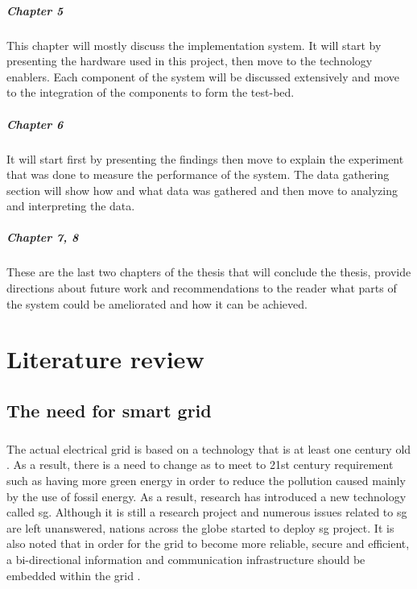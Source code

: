 \documentclass[oneside,12pt,a4paper,final]{book}
\begin{document}
\paragraph{Chapter 5}
This chapter will mostly discuss the implementation system. It will start by presenting the hardware used in this project, then move to the technology enablers. Each component of the system will be discussed extensively and move to the integration of the components to form the test-bed.
\paragraph{Chapter 6}
It will start first by presenting the findings then move to explain the experiment that was done to measure the performance of the system. The data gathering section will show how and what data was gathered and then move to analyzing and interpreting the data.
\paragraph{Chapter 7, 8}
These are the last two chapters of the thesis that will conclude the thesis, provide directions about future work and recommendations to the reader what parts of the system could be ameliorated and how it can be achieved.
\chapter{Literature review}
\section{The need for smart grid}
\paragraph{}
The actual electrical grid is based on a technology that is at least one century old \cite{ref5}. As a result, there is a need to change as to meet to 21st century requirement such as having more green energy in order to reduce the pollution caused mainly by the use of fossil energy. As a result, research has introduced a new technology called \gls{sg}. Although it is still a research project and numerous issues related to \gls{sg} are left unanswered, nations across the globe started to deploy \gls{sg} project. It is also noted that in order for the grid to become more reliable, secure and efficient, a bi-directional information and communication infrastructure should be embedded within the grid \cite{ref5}.
\end{document}
